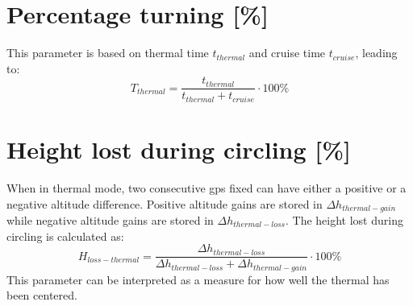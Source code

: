 \section{Percentage turning [\%]}
This parameter is based on thermal time ${{t_{thermal}}}$ and cruise time ${{t_{cruise}}} $, leading to:
\begin{equation}
{T_{thermal}} = \frac{{{t_{thermal}}}}{{{t_{thermal}} + {t_{cruise}}}} \cdot 100\% 
\end{equation}

\section{Height lost during circling [\%]}
When in thermal mode, two consecutive gps fixed can have either a positive or a negative altitude difference. Positive altitude gains are stored in $\Delta {h_{thermal-gain}}$ while negative altitude gains are stored in ${\Delta {h_{thermal-loss}}}$. The height lost during circling is calculated as:
\begin{equation}
{H_{loss - thermal}} = \frac{{\Delta {h_{thermal - loss}}}}{{\Delta {h_{thermal - loss}} + \Delta {h_{thermal - gain}}}} \cdot 100\%
\end{equation}
This parameter can be interpreted as a measure for how well the thermal has been centered.